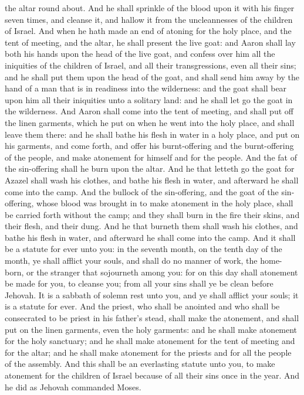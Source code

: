 the altar round about. And he shall sprinkle of the blood upon it with his finger seven times, and cleanse it, and hallow it from the uncleannesses of the children of Israel.  And when he hath made an end of atoning for the holy place, and the tent of meeting, and the altar, he shall present the live goat: and Aaron shall lay both his hands upon the head of the live goat, and confess over him all the iniquities of the children of Israel, and all their transgressions, even all their sins; and he shall put them upon the head of the goat, and shall send him away by the hand of a man that is in readiness into the wilderness: and the goat shall bear upon him all their iniquities unto a solitary land: and he shall let go the goat in the wilderness.  And Aaron shall come into the tent of meeting, and shall put off the linen garments, which he put on when he went into the holy place, and shall leave them there: and he shall bathe his flesh in water in a holy place, and put on his garments, and come forth, and offer his burnt-offering and the burnt-offering of the people, and make atonement for himself and for the people. And the fat of the sin-offering shall he burn upon the altar. And he that letteth go the goat for Azazel shall wash his clothes, and bathe his flesh in water, and afterward he shall come into the camp. And the bullock of the sin-offering, and the goat of the sin-offering, whose blood was brought in to make atonement in the holy place, shall be carried forth without the camp; and they shall burn in the fire their skins, and their flesh, and their dung. And he that burneth them shall wash his clothes, and bathe his flesh in water, and afterward he shall come into the camp.  And it shall be a statute for ever unto you: in the seventh month, on the tenth day of the month, ye shall afflict your souls, and shall do no manner of work, the home-born, or the stranger that sojourneth among you: for on this day shall atonement be made for you, to cleanse you; from all your sins shall ye be clean before Jehovah. It is a sabbath of solemn rest unto you, and ye shall afflict your souls; it is a statute for ever. And the priest, who shall be anointed and who shall be consecrated to be priest in his father’s stead, shall make the atonement, and shall put on the linen garments, even the holy garments: and he shall make atonement for the holy sanctuary; and he shall make atonement for the tent of meeting and for the altar; and he shall make atonement for the priests and for all the people of the assembly. And this shall be an everlasting statute unto you, to make atonement for the children of Israel because of all their sins once in the year. And he did as Jehovah commanded Moses. 

